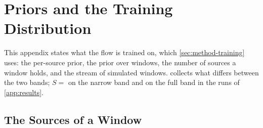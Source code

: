 \section{Priors and the Training Distribution}
\label{app:priors}

This appendix states what the flow is trained on, which \cref{sec:method-training} uses: the per-source prior,
the prior over windows, the number of sources a window holds, and the stream of simulated windows.
 collects what differs between the two bands; $S={}$\ResultsNarrowCounts{} on
the narrow band and \ResultsFullCounts{} on the full band in the runs of \cref{app:results}.

\subsection{The Sources of a Window}
\label{app:priors-sources}

